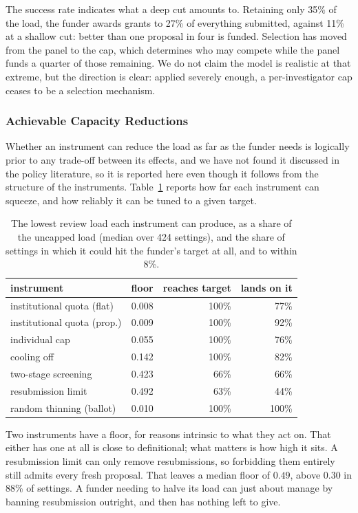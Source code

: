 \documentclass[11pt,a4paper]{article}
\begin{document}
The success rate indicates what a deep cut amounts to. Retaining only 35\% of the
load, the funder awards grants to 27\% of everything submitted, against 11\% at a
shallow cut: better than one proposal in four is funded. Selection has moved from
the panel to the cap, which determines who may compete while the panel funds a
quarter of those remaining. We do not claim the model is realistic at that
extreme, but the direction is clear: applied severely enough, a per-investigator
cap ceases to be a selection mechanism.

\subsubsection{Achievable Capacity Reductions}

Whether an instrument can reduce the load as far as the funder needs is logically
prior to any trade-off between its effects, and we have not found it discussed in the
policy literature, so it is reported here even though it follows from the
structure of the instruments. Table~\ref{tab:reach} reports how far each
instrument can squeeze, and how reliably it can be tuned to a given target.

\begin{table}[!htbp]
\centering
\small
\caption{The lowest review load each instrument can produce, as a share of the
uncapped load (median over 424 settings), and the share of settings in which it
could hit the funder's target at all, and to within 8\%.}
\label{tab:reach}
\begin{tabular}{lrrr}
\toprule
instrument & floor & reaches target & lands on it \\
\midrule
institutional quota (flat)  & 0.008 & 100\% & 77\%  \\
institutional quota (prop.) & 0.009 & 100\% & 92\%  \\
individual cap              & 0.055 & 100\% & 76\%  \\
cooling off                 & 0.142 & 100\% & 82\%  \\
two-stage screening        & 0.423 & 66\%  & 66\%  \\
resubmission limit          & 0.492 & 63\%  & 44\%  \\
random thinning (ballot)    & 0.010 & 100\% & 100\% \\
\bottomrule
\end{tabular}
\end{table}

Two instruments have a floor, for reasons intrinsic to what they act on. That
either has one at all is close to definitional; what matters is how high it sits.
A resubmission limit can only remove resubmissions, so forbidding them entirely
still admits every fresh proposal. That leaves a median floor of $0.49$, above
$0.30$ in 88\% of settings. A funder needing to halve its load can just
about manage by banning resubmission outright, and then has nothing left to
give.
\end{document}
